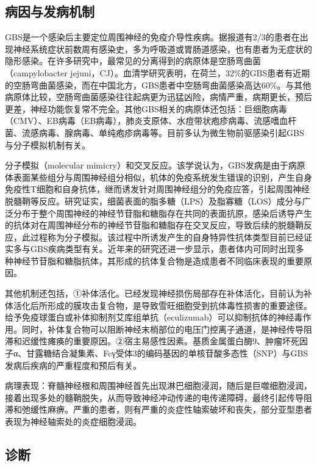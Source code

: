 \subsection{病因与发病机制}

GBS是一个感染后主要定位周围神经的免疫介导性疾病。据报道有2/3的患者在出现神经系统症状前数周有感染史，多为呼吸道或胃肠道感染，也有患者为无症状的隐形感染。在许多研究中，最常见的分离得到的病原体是空肠弯曲菌（campylobacter
jejuni，CJ）。血清学研究表明，在荷兰，32\%的GBS患者有近期的空肠弯曲菌感染，而在中国北方，GBS患者中空肠弯曲菌感染高达60\%。与其他病原体比较，空肠弯曲菌感染往往起病更为迅猛凶险，病情严重，病期更长，预后更差，神经功能恢复常不完全。其他GBS相关的病原体还包括：巨细胞病毒（CMV）、EB病毒（EB病毒），肺炎支原体、水痘带状疱疹病毒、流感嗜血杆菌、流感病毒、腺病毒、单纯疱疹病毒等。目前多认为微生物前驱感染引起GBS与分子模拟机制有关。

分子模拟（molecular
mimicry）和交叉反应。该学说认为，GBS发病是由于病原体表面某些组分与周围神经组分相似，机体的免疫系统发生错误的识别，产生自身免疫性T细胞和自身抗体，继而诱发针对周围神经组分的免疫应答，引起周围神经脱髓鞘等反应。研究证实，细菌表面的脂多糖（LPS）及脂寡糖（LOS）成分与广泛分布于整个周围神经的神经节苷脂和糖脂存在共同的表面抗原，感染后诱导产生的抗体对在周围神经分布的神经节苷脂和糖脂存在交叉反应，导致后续的脱髓鞘反应，此过程称为分子模拟。该过程中所诱发产生的自身特异性抗体类型目前已经证实多与GBS疾病类型有关。近年来的研究还进一步显示，患者体内可同时出现多种神经节苷脂和糖脂抗体，其形成的抗体复合物是造成患者不同临床表现的重要原因。

其他机制还包括，①补体活化。已经发现神经损伤局部存在补体活化，目前认为补体活化后所形成的膜攻击复合物，是导致雪旺细胞受到抗体毒性损害的重要途径。给予免疫球蛋白或补体抑制剂艾库组单抗（eculizumab）可以抑制抗体的神经毒作用。同时，补体复合物可以阻断神经末梢部位的电压门控离子通道，是神经传导阻滞和迟缓性瘫痪的重要原因。②宿主易感性因素。基质金属蛋白酶9、肿瘤坏死因子α、甘露糖结合凝集素、Fcγ受体3的编码基因的单核苷酸多态性（SNP）与GBS发病后疾病的严重程度和预后有关。

病理表现：脊髓神经根和周围神经首先出现淋巴细胞浸润，随后是巨噬细胞浸润，接着出现多处的髓鞘脱失，从而导致神经冲动传递的电传递障碍，最终引起传导阻滞和弛缓性麻痹。严重的患者，则有严重的炎症性轴索破坏和丧失，部分亚型患者表现为神经轴索处的炎症细胞浸润。

\subsection{诊断}

